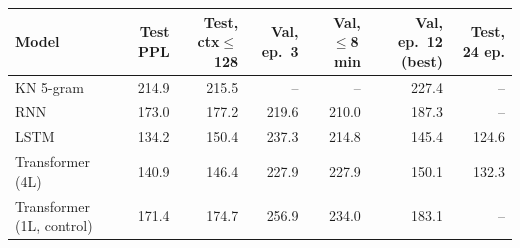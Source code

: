 \begin{tabular}{@{}lrrrrrr@{}}
\toprule
Model & Test PPL & Test, ctx$\le$128 & Val, ep.\ 3 & Val, $\le$8\,min & Val, ep.\ 12 (best) & Test, 24 ep. \\
\midrule
KN 5-gram & 214.9 & 215.5 & -- & -- & 227.4 & -- \\
RNN & 173.0 & 177.2 & 219.6 & 210.0 & 187.3 & -- \\
LSTM & 134.2 & 150.4 & 237.3 & 214.8 & 145.4 & 124.6 \\
Transformer (4L) & 140.9 & 146.4 & 227.9 & 227.9 & 150.1 & 132.3 \\
Transformer (1L, control) & 171.4 & 174.7 & 256.9 & 234.0 & 183.1 & -- \\
\bottomrule
\end{tabular}